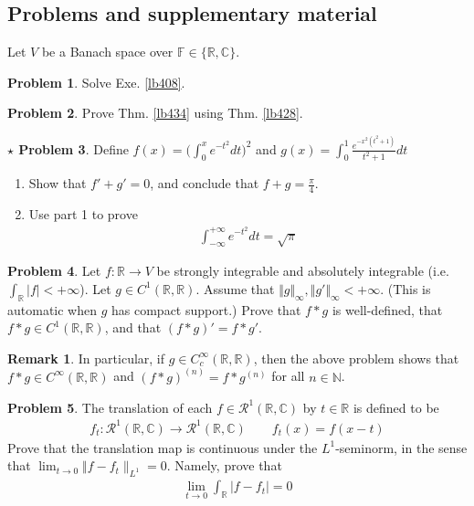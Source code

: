 \documentclass[12pt,b5paper,notitlepage]{article}
\theoremstyle{definition}
\newtheorem{rem}[df]{Remark}
\newtheorem{prob}{\color{red}Problem}[section]
\newtheorem{sprob}[prob]{\color{red}$\star$ Problem}
\theoremstyle{plain}
\newcommand{\scr}{\mathscr}
\newcommand{\Cbb}{\mathbb C}
\newcommand{\Nbb}{\mathbb N}
\newcommand{\Rbb}{\mathbb R}
\newcommand{\Fbb}{\mathbb F}
\newcommand{\dps}{\displaystyle}
\numberwithin{equation}{section}
\begin{document}
\subsection{Problems and supplementary material}



Let $V$ be a Banach space over $\Fbb\in\{\Rbb,\Cbb\}$.

\begin{prob}
Solve Exe. \ref{lb408}.
\end{prob}

\begin{prob}\label{lb430}
Prove Thm. \ref{lb434} using Thm. \ref{lb428}.
\end{prob}


\begin{sprob}\label{lb435}
Define $\dps f(x)=\Big(\int_0^x e^{-t^2}dt\Big)^2$ and $\dps g(x)=\int_0^1\frac{e^{-x^2(t^2+1)}}{t^2+1}dt$
\begin{enumerate}
\item Show that $f'+g'=0$, and conclude that $f+g=\frac\pi 4$.
\item Use part 1 to prove
\begin{align}
\int_{-\infty}^{+\infty}e^{-t^2}dt=\sqrt\pi 
\end{align}
\end{enumerate}
\end{sprob}


\begin{prob}\label{lb439}
Let $f:\Rbb\rightarrow V$ be strongly integrable and absolutely integrable (i.e. $\int_\Rbb |f|<+\infty$). Let $g\in C^1(\Rbb,\Rbb)$. Assume that $\Vert g\Vert_\infty,\Vert g'\Vert_\infty<+\infty$. (This is automatic when $g$ has compact support.) Prove that $f*g$ is well-defined, that $f*g\in C^1(\Rbb,\Rbb)$, and that $(f*g)'=f*g'$.
\end{prob}

\begin{rem}
In particular, if $g\in C_c^\infty(\Rbb,\Rbb)$, then the above problem shows that $f*g\in C^\infty(\Rbb,\Rbb)$ and $(f*g)^{(n)}=f*g^{(n)}$ for all $n\in\Nbb$.
\end{rem}



\begin{prob}
The translation of each $f\in\scr R^1(\Rbb,\Cbb)$ by $t\in\Rbb$ is defined to be
\begin{align*}
f_t:\scr R^1(\Rbb,\Cbb)\rightarrow\scr R^1(\Rbb,\Cbb)\qquad f_t(x)=f(x-t)
\end{align*}
Prove that the translation map is continuous under the $L^1$-seminorm, in the sense that $\lim_{t\rightarrow0}\Vert f-f_t\lVert_{L^1}=0$. Namely, prove that
\begin{align*}
\lim_{t\rightarrow 0}\int_\Rbb |f-f_t|=0
\end{align*}
\end{prob}
\end{document}
